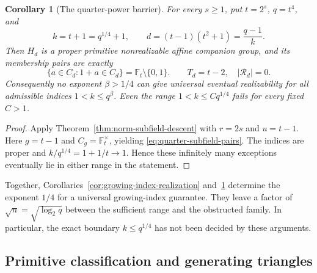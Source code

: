 \documentclass[11pt]{article}
\newtheorem{corollary}[theorem]{Corollary}
\begin{document}
\begin{corollary}[The quarter-power barrier]
\label{cor:quarter-power-barrier}
For every $s\ge1$, put $t=2^s$, $q=t^4$, and
\[
 k=t+1=q^{1/4}+1,\qquad d=(t-1)(t^2+1)=\frac{q-1}{k}.
\]
Then $H_d$ is a proper primitive nonrealizable affine companion group,
and its membership pairs are exactly
\begin{equation}\label{eq:quarter-subfield-pairs}
 \{a\in C_d:1+a\in C_d\}=\mathbb F_t\setminus\{0,1\}.
 \qquad T_d=t-2,\quad |\mathcal R_d|=0.
\end{equation}
Consequently no exponent $\beta>1/4$ can give universal eventual
realizability for all admissible indices $1<k\le q^\beta$.
Even the range $1<k\le Cq^{1/4}$ fails for every fixed $C>1$.
\end{corollary}
\begin{proof}
Apply Theorem~\ref{thm:norm-subfield-descent} with $r=2s$ and
$u=t-1$. Here $g=t-1$ and $C_g=\mathbb F_t^\times$, yielding
\eqref{eq:quarter-subfield-pairs}. The indices are proper and
$k/q^{1/4}=1+1/t\to1$. Hence these infinitely many exceptions
eventually lie in either range in the statement.
\end{proof}

Together, Corollaries~\ref{cor:growing-index-realization}
and~\ref{cor:quarter-power-barrier} determine the exponent $1/4$
for a universal growing-index guarantee. They leave a factor of
$\sqrt n=\sqrt{\log_2q}$ between the sufficient range and the
obstructed family. In particular, the exact boundary $k\le q^{1/4}$
has not been decided by these arguments.

\subsection{Primitive classification and generating triangles}
\end{document}

